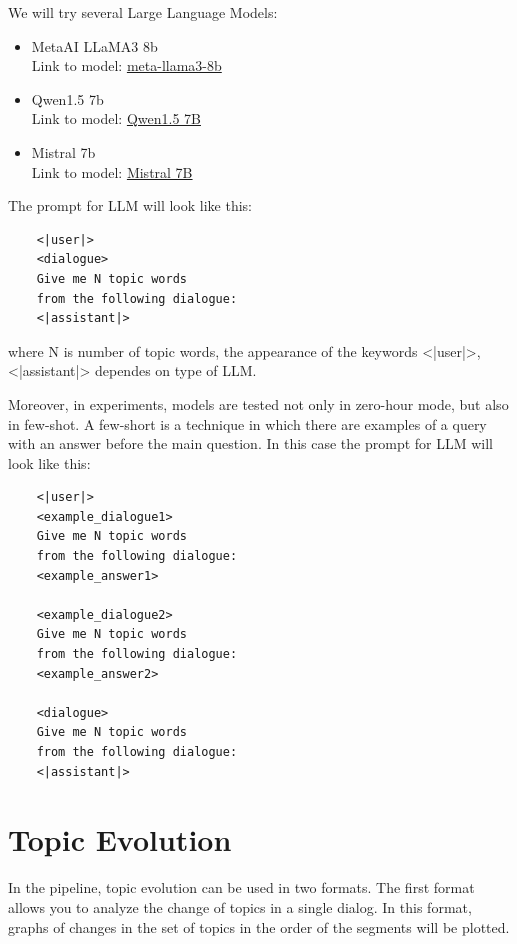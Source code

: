 \documentclass[PMI,VKR]{HSEUniversity}
\begin{document}
We will try several Large Language Models:
\begin{itemize}
    \item MetaAI LLaMA3 8b \\
    Link to model: \href{https://huggingface.co/meta-llama/Meta-Llama-3-8B-Instruct}{meta-llama3-8b}
    \item Qwen1.5 7b \\
    Link to model: \href{https://huggingface.co/Qwen/Qwen1.5-7B-Chat}{Qwen1.5 7B}
    \item Mistral 7b \\
    Link to model: \href{https://huggingface.co/mistralai/Mistral-7B-Instruct-v0.1}{Mistral 7B}
\end{itemize}  

The prompt for LLM will look like this:

\begin{lstlisting}
    <|user|> 
    <dialogue> 
    Give me N topic words 
    from the following dialogue:
    <|assistant|>
\end{lstlisting}

where N is number of topic words, the appearance of the keywords <|user|>, <|assistant|> dependes on type of LLM.

Moreover, in experiments, models are tested not only in zero-hour mode, but also in few-shot.
A few-short is a technique in which there are examples of a query with an answer before the main question.
In this case the prompt for LLM will look like this:

\begin{lstlisting}
    <|user|> 
    <example_dialogue1> 
    Give me N topic words 
    from the following dialogue:
    <example_answer1>

    <example_dialogue2> 
    Give me N topic words 
    from the following dialogue:
    <example_answer2>

    <dialogue> 
    Give me N topic words 
    from the following dialogue:
    <|assistant|>
\end{lstlisting}



\section{Topic Evolution}

In the pipeline, topic evolution can be used in two formats. 
The first format allows you to analyze the change of topics in a single dialog. In this format, graphs of changes in the set of topics in the order of the segments will be plotted. 
\end{document}

